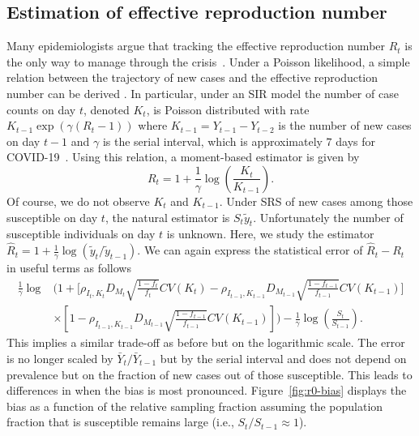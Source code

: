\documentclass[11pt]{amsart}
\numberwithin{equation}{section}
\theoremstyle{plain}
\begin{document}
\subsection{Estimation of effective reproduction number}
\label{section:r0-estimation}
Many epidemiologists argue that tracking the effective reproduction number $R_t$ is the only way to manage through the crisis~\citep{Gabriel2020}.  Under a Poisson likelihood, a simple relation between the trajectory of new cases and the effective reproduction number can be derived \citep{Bettencourt2008}.  In particular, under an SIR model the number of case counts on day $t$, denoted $K_t$, is Poisson distributed with rate $K_{t-1} \exp \left( \gamma (R_t - 1) \right)$ where $K_{t-1} = Y_{t-1}-Y_{t-2}$ is the number of new cases on day $t-1$ and $\gamma$ is the serial interval, which is approximately $7$ days for COVID-19~\citep{Sanche2020}.  Using this relation, a moment-based estimator is given by
$$
R_t = 1 + \frac{1}{\gamma} \log \left( \frac{K_t}{K_{t-1}} \right).
$$
Of course, we do not observe $K_t$ and $K_{t-1}$.  Under SRS of new cases among those susceptible on day $t$, the natural estimator is $S_t \tilde y_t$.  Unfortunately the number of susceptible individuals on day $t$ is unknown. Here, we study the estimator $\hat R_t = 1 + \frac{1}{\gamma} \log \left( \tilde y_t / \tilde y_{t-1} \right)$. We can again express the statistical error of $\hat R_t - R_t$ in useful terms as follows
$$
\begin{aligned}
\frac{1}{\gamma}\log &\bigg( 1 + \bigg[ \rho_{I_t,K_t} D_{M_t} \sqrt{\frac{1-f_t}{f_t}} CV (K_t)  -\rho_{I_{t-1},K_{t-1}} D_{M_{t-1}} \sqrt{\frac{1-f_{t-1}}{f_{t-1}}} CV (K_{t-1}) \bigg] \\
&\times \left[ 1 - \rho_{I_{t-1},K_{t-1}} D_{M_{t-1}} \sqrt{\frac{1-f_{t-1}}{f_{t-1}}} CV (K_{t-1}) \right] \bigg) - \frac{1}{\gamma} \log \left( \frac{S_t}{S_{t-1}} \right).
\end{aligned}
$$
This implies a similar trade-off as before but on the logarithmic scale.  The error is no longer scaled by $\bar Y_t/\bar Y_{t-1}$ but by the serial interval and does not depend on prevalence but on the fraction of new cases out of those susceptible. This leads to differences in when the bias is most pronounced. Figure~\ref{fig:r0-bias} displays the bias as a function of the relative sampling fraction assuming the population fraction that is susceptible remains large (i.e., $S_t / S_{t-1} \approx 1$).
\end{document}
